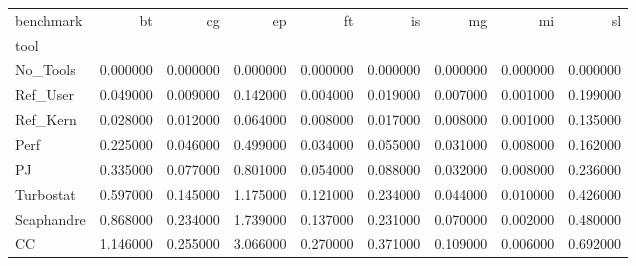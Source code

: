 \begin{tabular}{lrrrrrrrr}
\toprule
benchmark & bt & cg & ep & ft & is & mg & mi & sl \\
tool &  &  &  &  &  &  &  &  \\
\midrule
No_Tools & 0.000000 & 0.000000 & 0.000000 & 0.000000 & 0.000000 & 0.000000 & 0.000000 & 0.000000 \\
Ref_User & 0.049000 & 0.009000 & 0.142000 & 0.004000 & 0.019000 & 0.007000 & 0.001000 & 0.199000 \\
Ref_Kern & 0.028000 & 0.012000 & 0.064000 & 0.008000 & 0.017000 & 0.008000 & 0.001000 & 0.135000 \\
Perf & 0.225000 & 0.046000 & 0.499000 & 0.034000 & 0.055000 & 0.031000 & 0.008000 & 0.162000 \\
PJ & 0.335000 & 0.077000 & 0.801000 & 0.054000 & 0.088000 & 0.032000 & 0.008000 & 0.236000 \\
Turbostat & 0.597000 & 0.145000 & 1.175000 & 0.121000 & 0.234000 & 0.044000 & 0.010000 & 0.426000 \\
Scaphandre & 0.868000 & 0.234000 & 1.739000 & 0.137000 & 0.231000 & 0.070000 & 0.002000 & 0.480000 \\
CC & 1.146000 & 0.255000 & 3.066000 & 0.270000 & 0.371000 & 0.109000 & 0.006000 & 0.692000 \\
\bottomrule
\end{tabular}
